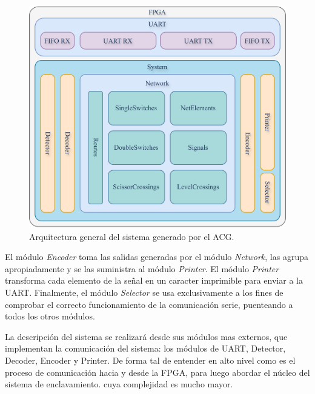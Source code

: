 	\begin{figure}[H]
		\centering
		\includegraphics[width=1\textwidth]{Figuras/Arq_general.png}
		\centering\caption{Arquitectura general del sistema generado por el ACG.}
		\label{fig:GeneralSystem}
	\end{figure}
	
	El módulo \textit{Encoder} toma las salidas generadas por el módulo \textit{Network}, las agrupa apropiadamente y se las suministra al módulo \textit{Printer}. El módulo \textit{Printer} transforma cada elemento de la señal en un caracter imprimible para enviar a la UART. Finalmente, el módulo \textit{Selector} se usa exclusivamente a los fines de comprobar el correcto funcionamiento de la comunicación serie, puenteando a todos los otros módulos.
	
	La descripción del sistema se realizará desde sus módulos mas externos, que implementan la comunicación del sistema: los módulos de UART, Detector, Decoder, Encoder y Printer. De forma tal de entender en alto nivel como es el proceso de comunicación hacia y desde la FPGA, para luego abordar el núcleo del sistema de enclavamiento. cuya complejidad es mucho mayor.		
	
	
	
	
	
	
	
	